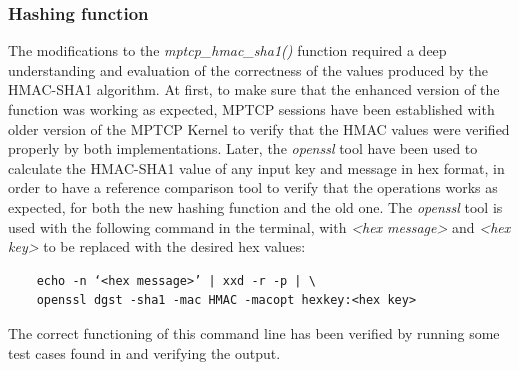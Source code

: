 \subsubsection{Hashing function}
The modifications to the \textit{mptcp\_hmac\_sha1()} function required a deep understanding and evaluation of the correctness of the values produced by the HMAC-SHA1 algorithm. At first, to make sure that the enhanced version of the function was working as expected, MPTCP sessions have been established with older version of the MPTCP Kernel to verify that the HMAC values were verified properly by both implementations. Later, the \textit{openssl} tool have been used to calculate the HMAC-SHA1 value of any input key and message in hex format, in order to have a reference comparison tool to verify that the operations works as expected, for both the new hashing function and the old one. The \textit{openssl} tool is used with the following command in the terminal, with \textit{<hex message>} and \textit{<hex key>} to be replaced with the desired hex values:

\begin{verbatim}
	echo -n ‘<hex message>’ | xxd -r -p | \
	openssl dgst -sha1 -mac HMAC -macopt hexkey:<hex key>
\end{verbatim}
 
The correct functioning of this command line has been verified by running some test cases found in  and verifying the output.

